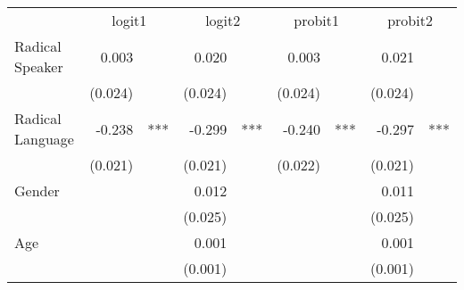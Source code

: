 \documentclass{article}
\begin{document}
\begin{table}[!h]
\centering
\begin{tabular}{lllllllll}
\cline{1-9}
\multicolumn{1}{r}{} &
  \multicolumn{2}{c}{logit1} &
  \multicolumn{2}{c}{logit2} &
  \multicolumn{2}{c}{probit1} &
  \multicolumn{2}{c}{probit2} \\
\cline{1-9}
\multicolumn{1}{l}{Radical Speaker} &
  \multicolumn{1}{r}{0.003} &
  \multicolumn{1}{l}{} &
  \multicolumn{1}{r}{0.020} &
  \multicolumn{1}{l}{} &
  \multicolumn{1}{r}{0.003} &
  \multicolumn{1}{l}{} &
  \multicolumn{1}{r}{0.021} &
  \multicolumn{1}{l}{} \\
\multicolumn{1}{l}{} &
  \multicolumn{1}{r}{(0.024)} &
  \multicolumn{1}{l}{} &
  \multicolumn{1}{r}{(0.024)} &
  \multicolumn{1}{l}{} &
  \multicolumn{1}{r}{(0.024)} &
  \multicolumn{1}{l}{} &
  \multicolumn{1}{r}{(0.024)} &
  \multicolumn{1}{l}{} \\
\multicolumn{1}{l}{Radical Language} &
  \multicolumn{1}{r}{-0.238} &
  \multicolumn{1}{l}{***} &
  \multicolumn{1}{r}{-0.299} &
  \multicolumn{1}{l}{***} &
  \multicolumn{1}{r}{-0.240} &
  \multicolumn{1}{l}{***} &
  \multicolumn{1}{r}{-0.297} &
  \multicolumn{1}{l}{***} \\
\multicolumn{1}{l}{} &
  \multicolumn{1}{r}{(0.021)} &
  \multicolumn{1}{l}{} &
  \multicolumn{1}{r}{(0.021)} &
  \multicolumn{1}{l}{} &
  \multicolumn{1}{r}{(0.022)} &
  \multicolumn{1}{l}{} &
  \multicolumn{1}{r}{(0.021)} &
  \multicolumn{1}{l}{} \\
\multicolumn{1}{l}{Gender} &
  \multicolumn{1}{r}{} &
  \multicolumn{1}{l}{} &
  \multicolumn{1}{r}{0.012} &
  \multicolumn{1}{l}{} &
  \multicolumn{1}{r}{} &
  \multicolumn{1}{l}{} &
  \multicolumn{1}{r}{0.011} &
  \multicolumn{1}{l}{} \\
\multicolumn{1}{l}{} &
  \multicolumn{1}{r}{} &
  \multicolumn{1}{l}{} &
  \multicolumn{1}{r}{(0.025)} &
  \multicolumn{1}{l}{} &
  \multicolumn{1}{r}{} &
  \multicolumn{1}{l}{} &
  \multicolumn{1}{r}{(0.025)} &
  \multicolumn{1}{l}{} \\
\multicolumn{1}{l}{Age} &
  \multicolumn{1}{r}{} &
  \multicolumn{1}{l}{} &
  \multicolumn{1}{r}{0.001} &
  \multicolumn{1}{l}{} &
  \multicolumn{1}{r}{} &
  \multicolumn{1}{l}{} &
  \multicolumn{1}{r}{0.001} &
  \multicolumn{1}{l}{} \\
\multicolumn{1}{l}{} &
  \multicolumn{1}{r}{} &
  \multicolumn{1}{l}{} &
  \multicolumn{1}{r}{(0.001)} &
  \multicolumn{1}{l}{} &
  \multicolumn{1}{r}{} &
  \multicolumn{1}{l}{} &
  \multicolumn{1}{r}{(0.001)} &
  \multicolumn{1}{l}{} \\

\end{tabular}
\end{table}
\end{document}
